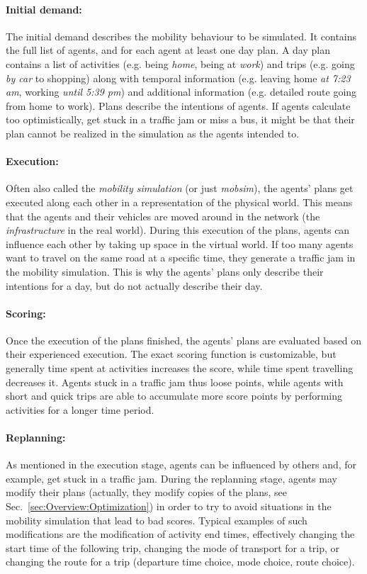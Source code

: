 \paragraph{Initial demand:}
The initial demand describes the mobility behaviour to be simulated. It contains
the full list of agents, and for each agent at least one day plan. A day plan
contains a list of activities (e.g. being \emph{home}, being at \emph{work}) and
trips (e.g. going \emph{by car} to shopping) along with temporal information
(e.g. leaving home \emph{at 7:23 am}, working \emph{until 5:39 pm}) and
additional information (e.g. detailed route going from home to work). Plans
describe the intentions of agents. If agents calculate too optimistically, get
stuck in a traffic jam or miss a bus, it might be that their plan cannot be
realized in the simulation as the agents intended to.

\paragraph{Execution:}
Often also called the \emph{mobility simulation} (or just \emph{mobsim}), the
agents' plans get executed along each other in a representation of the physical
world. This means that the agents and their vehicles are moved around in the
network (the \emph{infrastructure} in the real world). During this execution of
the plans, agents can influence each other by taking up space in the virtual
world. If too many agents want to travel on the same road at a specific time,
they generate a traffic jam in the mobility simulation. This is why the agents'
plans only describe their intentions for a day, but do not actually describe
their day.

\paragraph{Scoring:}
Once the execution of the plans finished, the agents' plans are evaluated based
on their experienced execution. The exact scoring function is customizable, but
generally time spent at activities increases the score, while time spent
travelling decreases it. Agents stuck in a traffic jam thus loose points, while
agents with short and quick trips are able to accumulate more score points by
performing activities for a longer time period.

\paragraph{Replanning:}
As mentioned in the execution stage, agents can be influenced by others and, for
example, get stuck in a traffic jam. During the replanning stage, agents may
modify their plans (actually, they modify copies of the plans, see
Sec.~\ref{sec:Overview:Optimization}) in order to try to avoid situations in the
mobility simulation that lead to bad scores. Typical examples of such
modifications are the modification of activity end times, effectively changing
the start time of the following trip, changing the mode of transport for a trip,
or changing the route for a trip (departure time choice, mode choice, route
choice).

